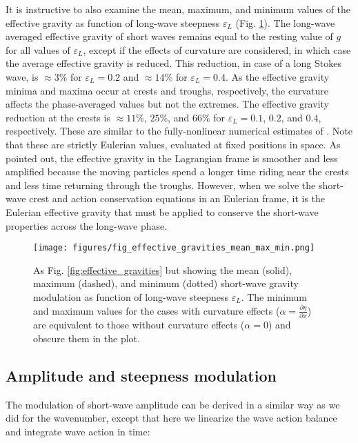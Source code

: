 \documentclass[lineno]{jfm}
\begin{document}
It is instructive to also examine the mean, maximum, and minimum values of the
effective gravity as function of long-wave steepness $\varepsilon_L$
(Fig. \ref{fig:effective_gravities_mean_max_min}).
The long-wave averaged effective gravity of short waves remains equal to the
resting value of $g$ for all values of $\varepsilon_L$, except if the effects
of curvature are considered, in which case the average effective gravity is
reduced.
This reduction, in case of a long Stokes wave, is $\approx 3\%$ for
$\varepsilon_L = 0.2$ and $\approx 14\%$ for $\varepsilon_L = 0.4$.
As the effective gravity minima and maxima occur at crests and troughs,
respectively, the curvature affects the phase-averaged values but not the extremes.
The effective gravity reduction at the crests is $\approx 11\%$, $25\%$, and $66\%$
for $\varepsilon_L = 0.1$, $0.2$, and $0.4$, respectively.
These are similar to the fully-nonlinear numerical estimates of
\citet{longuet1986eulerian,longuet1987propagation}.
Note that these are strictly Eulerian values, evaluated at fixed positions in
space.
As \citet{longuet1986eulerian} pointed out, the effective gravity in the
Lagrangian frame is smoother and less amplified because the moving particles
spend a longer time riding near the crests and less time returning through the
troughs.
However, when we solve the short-wave crest and action conservation equations
in an Eulerian frame, it is the Eulerian effective gravity that must be applied
to conserve the short-wave properties across the long-wave phase.

\begin{figure}
\centering
\texttt{[image: figures/fig\_effective\_gravities\_mean\_max\_min.png]}
\caption{
  As Fig. \ref{fig:effective_gravities} but showing the mean (solid),
  maximum (dashed), and minimum (dotted) short-wave gravity modulation as
  function of long-wave steepness $\varepsilon_L$.
  The minimum and maximum values for the cases with curvature effects
  ($\alpha=\frac{\partial \eta}{\partial x}$) are equivalent to those without
  curvature effects ($\alpha=0$) and obscure them in the plot.
}
\label{fig:effective_gravities_mean_max_min}
\end{figure}

\subsection{Amplitude and steepness modulation}
\label{subsection:amplitude_modulation}

The modulation of short-wave amplitude can be derived in a similar way as we did
for the wavenumber, except that here we linearize the wave action balance and
integrate wave action in time:
\end{document}
